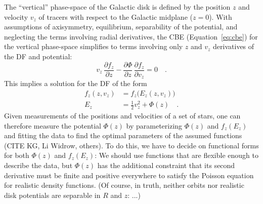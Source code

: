 

The ``vertical'' phase-space of the Galactic disk is defined by the position $z$ and
velocity $v_z$ of tracers with respect to the Galactic midplane ($z=0$).
With assumptions of axisymmetry, equilibrium, separability of the potential, and
neglecting the terms involving radial derivatives, the CBE (Equation~\ref{eq:cbe}) for
the vertical phase-space simplifies to terms involving only $z$ and $v_z$ derivatives of
the DF and potential:
\begin{equation}
    v_z \, \frac{\partial f_z}{\partial z} - \frac{\partial \Phi}{\partial z} \, \frac{\partial f_z}{\partial v_z} = 0 \quad .
    \label{eq:cbe-1d}
\end{equation}
This implies a solution for the DF of the form
\begin{align}
    f_z(z, v_z) &= f_z\Big(E_z(z, v_z)\Big)\\
    E_z &= \frac{1}{2} v_z^2 + \Phi(z) \quad .
\end{align}
Given measurements of the positions and velocities of a set of stars, one can therefore
measure the potential $\Phi(z)$ by parameterizing $\Phi(z)$ and $f_z(E_z)$ and fitting
the data to find the optimal parameters of the assumed functions (CITE KG, Li Widrow,
others).
To do this, we have to decide on functional forms for both $\Phi(z)$ and $f_z(E_z)$: We
should use functions that are flexible enough to describe the data, but $\Phi(z)$ has
the additional constraint that its second derivative must be finite and positive
everywhere to satisfy the Poisson equation for realistic density functions.
(Of course, in truth, neither orbits nor realistic disk potentials are separable in $R$ and $z$: ...)



